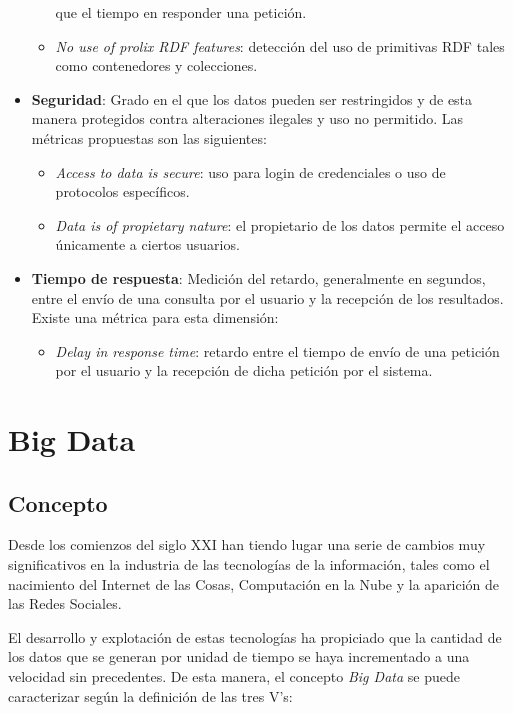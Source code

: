 \begin{itemize}
\begin{itemize}
    que el tiempo en responder una petición. 
  \item \textit{No use of prolix \acs{RDF} features}: detección del uso de
    primitivas \acs{RDF} tales como contenedores y colecciones. 
  \end{itemize}
\item \textbf{Seguridad}: Grado en el que los datos pueden ser restringidos y de
  esta manera protegidos contra alteraciones ilegales y uso no permitido. Las
  métricas propuestas son las siguientes:
  \begin{itemize}
  \item \textit{Access to data is secure}: uso para login de credenciales o uso
    de protocolos específicos. 
  \item \textit{Data is of propietary nature}: el propietario de los datos
    permite el acceso únicamente a ciertos usuarios. 
  \end{itemize}
\item \textbf{Tiempo de respuesta}: Medición del retardo, generalmente en
  segundos, entre el envío de una consulta por el usuario y la recepción de los
  resultados. Existe una métrica para esta dimensión:

  \begin{itemize}
  \item \textit{Delay in response time}: retardo entre el tiempo de envío de una
    petición por el usuario y la recepción de dicha petición por el sistema. 
  \end{itemize}

\end{itemize}

\section{Big Data}

\subsection{Concepto}

Desde los comienzos del siglo XXI han tiendo lugar una serie de cambios muy
significativos en la industria de las tecnologías de la información, tales como
el nacimiento del Internet de las Cosas, Computación en la Nube y la aparición
de las Redes Sociales.

El desarrollo y explotación de estas tecnologías ha propiciado que la cantidad
de los datos que se generan por unidad de tiempo se haya incrementado a una
velocidad sin precedentes. De esta manera, el concepto \textit{Big Data} se
puede caracterizar según la definición de las tres V's:


